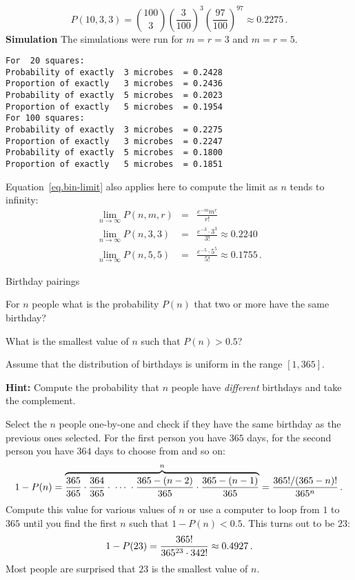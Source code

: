 \[
P(10,3,3) = {100 \choose 3} \left(\frac{3}{100}\right)^3 \left(\frac{97}{100}\right)^{97}\approx 0.2275\,.
\]
\textbf{Simulation}
The simulations were run for $m=r=3$ and $m=r=5$.
\begin{verbatim}
For  20 squares:
Probability of exactly  3 microbes  = 0.2428
Proportion of exactly   3 microbes  = 0.2436
Probability of exactly  5 microbes  = 0.2023
Proportion of exactly   5 microbes  = 0.1954
For 100 squares:
Probability of exactly  3 microbes  = 0.2275
Proportion of exactly   3 microbes  = 0.2247
Probability of exactly  5 microbes  = 0.1800
Proportion of exactly   5 microbes  = 0.1851
\end{verbatim}

Equation~\ref{eq.bin-limit} also applies here to compute the limit as $n$ tends to infinity:
\begin{eqnarray*}
\lim_{n\rightarrow \infty}P(n,m,r) &=& \frac{e^{-m}m^r}{r!}\\
\lim_{n\rightarrow \infty} P(n,3,3) &=& \frac{e^{-3}\cdot 3^3}{3!}\approx 0.2240\\
\lim_{n\rightarrow \infty} P(n,5,5) &=& \frac{e^{-5}\cdot 5^5}{5!}\approx 0.1755\,.
\end{eqnarray*}




\begin{prob}{Birthday pairings}

 For $n$ people what is the probability $P(n)$ that two or more have the same birthday?

 What is the smallest value of $n$ such that $P(n)>0.5$?

Assume that the distribution of birthdays is uniform in the range $[1,365]$.

\textbf{Hint:} Compute the probability that $n$ people have \emph{different} birthdays and take the complement.
\end{prob}

\solution{}

Select the $n$ people one-by-one and check if they have the same birthday as the previous ones selected. For the first person you have $365$ days, for the second person you have $364$ days to choose from and so on:
\[
1-P(n)=
  \overbrace{\displaystyle\frac{365}{365}\cdot\frac{364}{365}
  \cdot \;\cdots \; \cdot \frac{365-(n-2)}{365}
  \cdot\frac{365-(n-1)}{365}}^{n}
=\displaystyle\frac{365!/(365-n)!}{365^{n}}\,.
\]
Compute this value for various values of $n$ or use a computer to loop from $1$ to $365$ until you find the first $n$ such that $1-P(n)<0.5$. This turns out to be $23$:
\[
1-P(23)=\displaystyle\frac{365!}{365^{23}\cdot 342!}\approx 0.4927\,.
\]
Most people are surprised that $23$ is the smallest value of $n$.


